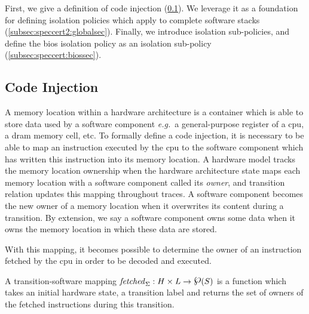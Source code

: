 First, we give a definition of code injection (\ref{subsec:speccert:tampering}).
%
We leverage it as a foundation for defining isolation policies which apply to
complete software stacks (\ref{subsec:speccert2:globalsec}).
%
  Finally, we introduce
isolation sub-policies, and define the \ac{bios} isolation policy as an
isolation sub-policy (\ref{subsec:speccert:biossec}).

\subsection{Code Injection}
\label{subsec:speccert:tampering}

A memory location within a hardware architecture is a container which is able to
store data used by a software component \emph{e.g.}~a general-purpose register
of a \ac{cpu}, a \ac{dram} memory cell, etc.
%
To formally define a code injection, it is necessary to be able to map an
instruction executed by the \ac{cpu} to the software component which has written
this instruction into its memory location.
%
A hardware model tracks the memory location ownership when the hardware
architecture state maps each memory location with a software component called
its \emph{owner}, and transition relation updates this mapping throughout
traces.
%
A software component becomes the new owner of a memory location when it
overwrites its content during a transition. 
%
By extension, we say a software component owns some data when it owns the memory
location in which these data are stored.

With this mapping, it becomes possible to determine the owner of an instruction
fetched by the \ac{cpu} in order to be decoded and executed.

\begin{definition}
  \label{def:speccert2:transsoft}
  A transition-software mapping
  $\func{fetched}_{\Sigma}: H \times L \rightarrow \powerset(S)$ is a function
  which takes an initial hardware state, a transition label and returns the set
  of owners of the fetched instructions during this transition.
\end{definition}


